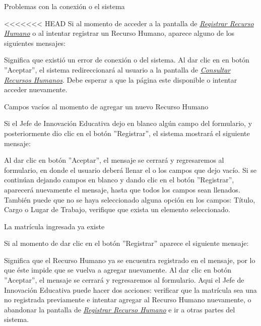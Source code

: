                \item Problemas con la conexión o el sistema

<<<<<<< HEAD
                    Si al momento de acceder a la pantalla de \hyperlink{registrarrh}{\textit{Registrar Recurso Humano}} o al intentar registrar un Recurso Humano, aparece alguno de los siguientes mensajes:

                    Significa que existió un error de conexión o del sistema. Al dar clic en en botón ''Aceptar'', el sistema redireccionará al usuario a la pantalla de \hyperlink{consultarrh}{\textit{Consultar Recursos Humanos}}. Debe esperar a que la página este disponible o intentar acceder nuevamente.

                \item Campos vacíos al momento de agregar un nuevo Recurso Humano

                    Si el Jefe de Innovación Educativa dejo en blanco algún campo del formulario, y posteriormente dio clic en el botón ''Registrar'', el sistema mostrará el siguiente mensaje:

                    Al dar clic en botón ''Aceptar'', el mensaje se cerrará y regresaremos al formulario, en donde el usuario deberá llenar el o los campos que dejo vacío. Si se continúan dejando campos en blanco y dando clic en el botón ''Registrar'', aparecerá nuevamente el mensaje, hasta que todos los campos sean llenados.\\

                    También puede que no se haya seleccionado alguna opción en los campos: Título, Cargo o Lugar de Trabajo, verifique que exista un elemento seleccionado.

                \item La matrícula ingresada ya existe

                    Si al momento de dar clic en el botón ''Registrar'' aparece el siguiente mensaje:

                    Significa que el Recurso Humano ya se encuentra registrado en el mensaje, por lo que éste impide que se vuelva a agregar nuevamente. Al dar clic en botón ''Aceptar'', el mensaje se cerrará y regresaremos al formulario. Aqui el Jefe de Innovación Educativa puede hacer dos acciones: verificar que la matrícula sea una no registrada previamente e intentar agregar al Recurso Humano nuevamente, o abandonar la pantalla de \hyperlink{registrarrh}{\textit{Registrar Recurso Humano}} e ir a otras partes del sistema.

